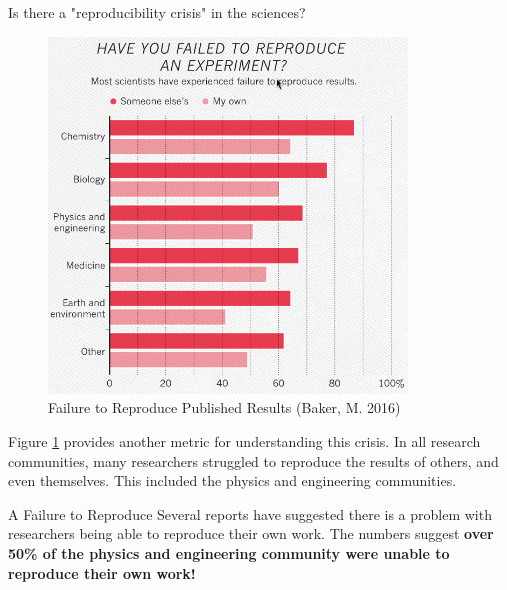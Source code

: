 \documentclass[final]{beamer}
\newlength{\colwidth}
\begin{document}
\begin{frame}[t]
\begin{columns}[t]
\begin{column}{\colwidth}
\begin{block}{Is there a "reproducibility crisis" in the sciences?}
    \begin{figure}
      \centering
      \includegraphics[width=0.85\textwidth]{tess2024/Nature-Reproducibility-Failure-.png}
      \caption{Failure to Reproduce Published Results (Baker, M. 2016)\cite{baker2016}}
      \label{fig:failure}
    \end{figure}
    
    Figure \ref*{fig:failure} provides another metric for understanding this
    crisis.
    In all research communities, many researchers struggled to reproduce the
    results of others, and even themselves.
    This included the physics and engineering communities.

  \end{block}

  \begin{alertblock}{A Failure to Reproduce}
    Several reports have suggested there is a problem with researchers being
    able to reproduce their own work.
    The numbers suggest \textbf{over 50\% of the physics and engineering
    community were unable to reproduce their own work!}

  \end{alertblock}


\end{column}
\end{columns}
\end{frame}
\end{document}

